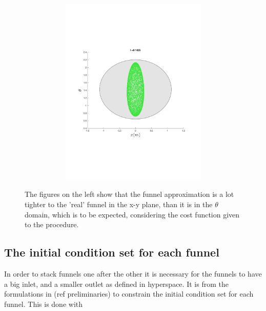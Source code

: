 \begin{figure}
{\begin{subfigure}{0.5\textwidth}
\begin{subfigure}[b]{0.5\textwidth}
        \includegraphics[trim={1cm 7cm 1cm 7cm},
        width=\textwidth]{figures/method/FunnelSimOverlaid20funnel-1y-theta}
      \end{subfigure}%
    \end{subfigure}%
  }
  \caption{The figures on the left show that the funnel approximation is a lot
    tighter to the 'real' funnel in the x-y plane, than it is in the \(\theta\)
    domain, which is to be expected, considering the cost function given to the
    procedure.}
\end{figure}

\subsection{The initial condition set for each funnel}

In order to stack funnels one after the other it is necessary for the funnels to
have a big inlet, and a smaller outlet as defined in hyperspace. It is from the
formulations in (ref preliminaries) to constrain the initial condition set for
each funnel. This is done with

